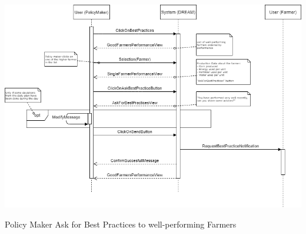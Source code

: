 \documentclass{article}
\begin{document}
\begin{center}
    \includegraphics[width=1.0\textwidth]{images/sequenceDiagrams/22. PolicyMakerAskForBestPractice.png}
    \par
    \caption{\label{fig:frog}Policy Maker Ask for Best Practices to well-performing Farmers}

    \newpage
    
    
    
    
    
    
    
    
    
    

\end{center}
\end{document}
